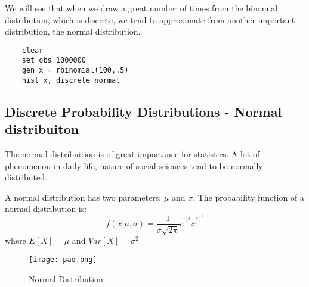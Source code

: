 \documentclass[11pt]{article}
\begin{document}
We will see that when we draw a great number of times from the binomial distribution, which is discrete, we tend to approximate from another important distribution, the normal distribution.

	\begin{verbatim}
	clear
	set obs 1000000
	gen x = rbinomial(100,.5)
	hist x, discrete normal
	\end{verbatim}

	\subsection*{Discrete Probability Distributions - Normal distribuiton}

The normal distribuition is of great importance for statistics. A lot of phenomenon in daily life, nature of social sciences tend to be normally distributed.


A normal distribution has two parameters: $\mu$ and $\sigma$. The probability function of a normal distribution is:
\[f(x|\mu,\sigma)=\frac{1}{\sigma \sqrt{2\pi}}e^{\frac{(x-\mu)^2}{2\sigma^2}}\]
where $E[X]=\mu$ and $Var[X]=\sigma^2$.

\begin{figure}[htp]
\centering
\texttt{[image: pao.png]}
\caption{Normal Distribution}
\label{}
\end{figure}
\end{document}
